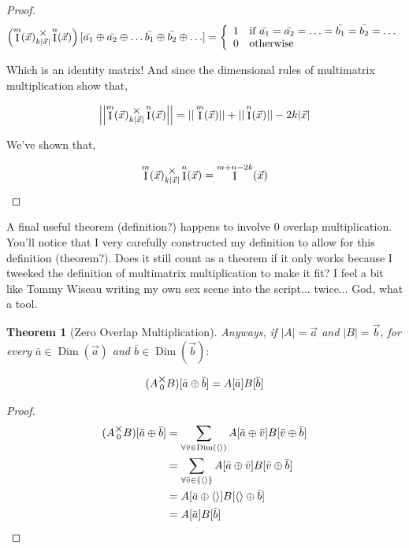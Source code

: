\documentclass[12pt]{book}
\theoremstyle{definition}
\theoremstyle{plain}
\newtheorem{theorem}{Theorem}[chapter]
\theoremstyle{ppart}
\theoremstyle{case}
\theoremstyle{solution}
\DeclareMathOperator{\Dim}{Dim}
\DeclareMathOperator{\Ident}{I}
\newcommand{\mmult}[1]{\text{\raisebox{1ex}{$\underset{#1}{\times}$}}}
\begin{document}
\begin{landscape}
\begin{proof}
\begin{align*}
\left( \Ident^m(\vec{x}) \mmult{k|\vec{x}|} \Ident^n(\vec{x}) \right)
[\bar{a_1} \oplus \bar{a_2} \oplus \ldots \bar{b_1} \oplus \bar{b_2} \oplus \ldots] =
\left\{
  \begin{array}{ll}
    1 & \mbox{if } \bar{a_1} = \bar{a_2} = \ldots = \bar{b_1} = \bar{b_2} = \ldots \\
    0 & \mbox{otherwise}
  \end{array}
\right.
\end{align*} 

Which is an identity matrix! And since the dimensional rules of multimatrix 
multiplication show that,

\[
 \left|\left| \Ident^m(\vec{x}) \mmult{k|\vec{x}|} \Ident^n(\vec{x}) \right|\right|
 =
 ||\Ident^m(\vec{x})|| + ||\Ident^n(\vec{x})|| - 2k|\vec{x}|
\]

We've shown that,

\[ \Ident^m(\vec{x}) \mmult{k|\vec{x}|} \Ident^n(\vec{x}) = \Ident^{m+n-2k}(\vec{x}) \]
\end{proof}
\end{landscape}

A final useful theorem (definition?) happens to involve 0 overlap multiplication.
You'll notice that I very carefully constructed my definition to allow for this
definition (theorem?). Does it still count as a theorem if it only works because
I tweeked the definition of multimatrix multiplication to make it fit? I feel
a bit like Tommy Wiseau writing my own sex scene into the script... twice... God,
what a tool.

\begin{theorem}[Zero Overlap Multiplication]
Anyways, if $|A| = \vec{a}$ and $|B| = \vec{b}$, for every $\bar{a} \in \Dim(\vec{a})$
and $\bar{b} \in \Dim(\vec{b}):$

\[ (A \mmult{0} B)[\bar{a} \oplus \bar{b}] = A[\bar{a}] B[\bar{b}] \]

\end{theorem}
\begin{proof}
\begin{align*}
	(A \mmult{0} B)[\bar{a} \oplus \bar{b}]
	&=
	\sum_{\forall \bar{v} \in \Dim(\left<\right>)}
	A[\bar{a} \oplus \bar{v}] B[\bar{v} \oplus \bar{b}] \\
	&=
	\sum_{\forall \bar{v} \in \left\{\left<\right>\right\}}
	A[\bar{a} \oplus \bar{v}] B[\bar{v} \oplus \bar{b}] \\
	&=
	A[\bar{a} \oplus \left<\right>] B[\left<\right> \oplus \bar{b}] \\
	&=
	A[\bar{a}] B[\bar{b}] \\
\end{align*}
\end{proof}
\end{document}
